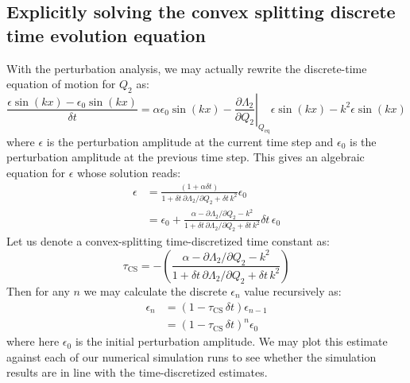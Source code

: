 \documentclass[reqno]{article}
\begin{document}
\subsection{Explicitly solving the convex splitting discrete time evolution equation}

With the perturbation analysis, we may actually rewrite the discrete-time equation of motion for $Q_2$ as:
\begin{equation}
    \frac{\epsilon \sin(k x) - \epsilon_0 \sin(kx)}{\delta t}
    =
    \alpha \epsilon_0 \sin(k x)
    - \left.\frac{\partial \Lambda_2}{\partial Q_2}\right|_{Q_\text{eq}} \epsilon \sin(kx)
    - k^2 \epsilon \sin(kx)
\end{equation}
where $\epsilon$ is the perturbation amplitude at the current time step and $\epsilon_0$ is the perturbation amplitude at the previous time step.
This gives an algebraic equation for $\epsilon$ whose solution reads:
\begin{equation}
    \begin{split}
        \epsilon
        &=
        \frac{\left(1 + \alpha \delta t \right)}
        {1 + \delta t \, \partial \Lambda_2 / \partial Q_2 + \delta t \, k^2} \epsilon_0 \\
        &=
        \epsilon_0
        +
        \frac{\alpha - \partial \Lambda_2 / \partial Q_2 - k^2}
        {1 + \delta t \, \partial \Lambda_2 / \partial Q_2 + \delta t \, k^2}
        \delta t \, \epsilon_0
    \end{split}
\end{equation}
Let us denote a convex-splitting time-discretized time constant as:
\begin{equation}
    \tau_\text{CS}
    =
    -\left( \frac{\alpha - \partial \Lambda_2 / \partial Q_2 - k^2}
    {1 + \delta t \, \partial \Lambda_2 / \partial Q_2 + \delta t \, k^2} \right)
\end{equation}
Then for any $n$ we may calculate the discrete $\epsilon_n$ value recursively as:
\begin{equation}
    \begin{split}
        \epsilon_n
        &=
        \left( 1
        - \tau_\text{CS} \, \delta t
        \right) \epsilon_{n - 1} \\
        &=
        \left( 1
        - \tau_\text{CS} \, \delta t \right)^n \epsilon_0
    \end{split}
\end{equation}
where here $\epsilon_0$ is the initial perturbation amplitude.
We may plot this estimate against each of our numerical simulation runs to see whether the simulation results are in line with the time-discretized estimates.
\end{document}
